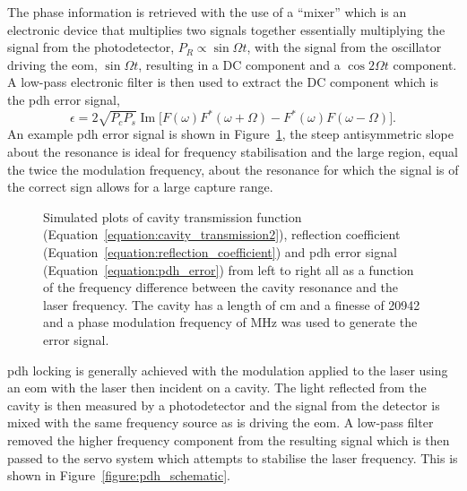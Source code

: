 The phase information is retrieved with the use of a ``mixer'' which is an electronic device that multiplies two signals together essentially multiplying the signal from the photodetector, $P_R \propto \sin\Omega t$, with the signal from the oscillator driving the \gls{eom}, $\sin\Omega t$, resulting in a DC component and a $\cos2\Omega t$ component.
A low-pass electronic filter is then used to extract the DC component which is the \gls{pdh} error signal,
\begin{equation}\label{equation:pdh_error}
\epsilon = 2\sqrt{P_cP_s}\operatorname{Im}\Bigg[F(\omega)F^*(\omega+\Omega) - F^*(\omega)F(\omega-\Omega)\Bigg].
\end{equation}
An example \gls{pdh} error signal is shown in Figure~\ref{figure:pdh_plots}, the steep antisymmetric slope about the resonance is ideal for frequency stabilisation and the large region, equal the twice the modulation frequency, about the resonance for which the signal is of the correct sign allows for a large capture range. 

\begin{figure}
\centering

\caption{Simulated plots of cavity transmission function (Equation~\ref{equation:cavity_transmission2}), reflection coefficient (Equation~\ref{equation:reflection_coefficient}) and \gls{pdh} error signal (Equation~\ref{equation:pdh_error}) from left to right all as a function of the frequency difference between the cavity resonance and the laser frequency.
The cavity has a length of \unit[10]{cm} and a finesse of 20942 and a phase modulation frequency of \unit[2]{MHz} was used to generate the error signal.}
\label{figure:pdh_plots}
\end{figure}

\Gls{pdh} locking is generally achieved with the modulation applied to the laser using an \gls{eom} with the laser then incident on a cavity.
The light reflected from the cavity is then measured by a photodetector and the signal from the detector is mixed with the same frequency source as is driving the \gls{eom}.
A low-pass filter removed the higher frequency component from the resulting signal which is then passed to the servo system which attempts to stabilise the laser frequency.
This is shown in Figure~\ref{figure:pdh_schematic}.

